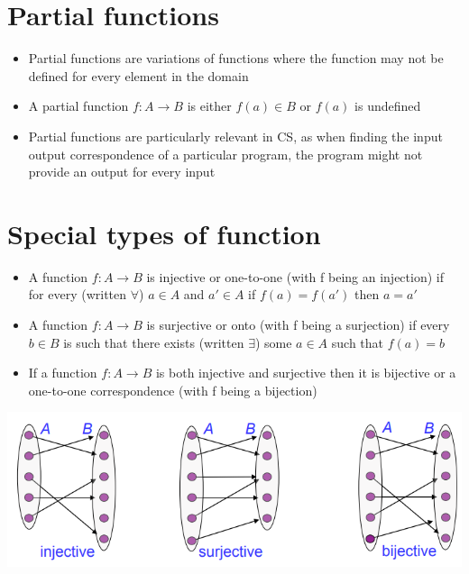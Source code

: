\documentclass{article}[18pt]
\begin{document}
\section{Partial functions}
\begin{itemize}
	\item Partial functions are variations of functions where the function may not be defined for every element in the domain
	\item A partial function $f:A\rightarrow B$ is either $f(a)\in B$ or $f(a)$ is undefined
	\item Partial functions are particularly relevant in CS, as when finding the input output correspondence of a particular program, the program might not provide an output for every input
\end{itemize}
\section{Special types of function}
\begin{itemize}
	\item A function $f:A\rightarrow B$ is injective or one-to-one (with f being an injection) if for every (written $\forall$) $a\in A$ and $a'\in A$ if $f(a)=f(a')$ then $a=a'$
	\item A function $f:A\rightarrow B$ is surjective or onto (with f being a surjection) if every $b\in B$ is such that there exists (written $\exists$) some $a\in A$ such that $f(a)=b$
	\item If a function $f: A\rightarrow B$ is both injective and surjective then it is bijective or a one-to-one correspondence (with f being a bijection)
\end{itemize}
\begin{center}
	\includegraphics[scale=0.7]{types}
\end{center}
\end{document}
